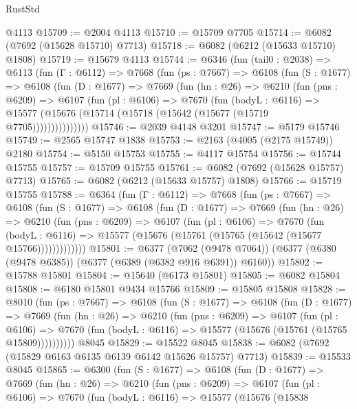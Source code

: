 \begin{lexlean}{RustStd}
\begin{coremodule}
    @4113
@15709 := @2004 @4113
@15710 := @15709 @7705
@15714 := @6082 (@7692 (@15628 @15710) @7713)
@15718 := @6082 (@6212 (@15633 @15710) @1808)
@15719 := @15679 @4113
@15744 := @6346
    (fun (tail0 : @2038) =>
    @6113
      (fun (Γ : @6112) =>
      @7668
        (fun (ps : @7667) =>
        @6108
          (fun (S : @1677) =>
          @6108
            (fun (D : @1677) =>
            @7669
              (fun (hn : @26) =>
              @6210
                (fun (pns : @6209) =>
                @6107
                  (fun (pl : @6106) =>
                  @7670
                    (fun (bodyL : @6116) =>
                    @15577 (@15676 (@15714 (@15718 (@15642 (@15677 (@15719 @7705)))))))))))))))
@15746 := @2039 @4148 @3201
@15747 := @5179 @15746
@15749 := @2565 @15747 @1838
@15753 := @2163 (@4005 (@2175 @15749)) @2180
@15754 := @5150 @15753
@15755 := @4117 @15754
@15756 := @15744 @15755
@15757 := @15709 @15755
@15761 := @6082 (@7692 (@15628 @15757) @7713)
@15765 := @6082 (@6212 (@15633 @15757) @1808)
@15766 := @15719 @15755
@15788 := @6364
    (fun (Γ : @6112) =>
    @7668
      (fun (ps : @7667) =>
      @6108
        (fun (S : @1677) =>
        @6108
          (fun (D : @1677) =>
          @7669
            (fun (hn : @26) =>
            @6210
              (fun (pns : @6209) =>
              @6107
                (fun (pl : @6106) =>
                @7670
                  (fun (bodyL : @6116) =>
                  @15577 (@15676 (@15761 (@15765 (@15642 (@15677 @15766)))))))))))))
@15801 := @6377
    (@7062 (@9478 @7064))
    (@6377 (@6380 (@9478 @6385)) (@6377 (@6389 (@6382 @916 @6391)) @6160))
@15802 := @15788 @15801
@15804 := @15640 (@6173 @15801)
@15805 := @6082 @15804
@15808 := @6180 @15801 @9434 @15766
@15809 := @15805 @15808
@15828 := @8010
    (fun (ps : @7667) =>
    @6108
      (fun (S : @1677) =>
      @6108
        (fun (D : @1677) =>
        @7669
          (fun (hn : @26) =>
          @6210
            (fun (pns : @6209) =>
            @6107
              (fun (pl : @6106) =>
              @7670 (fun (bodyL : @6116) => @15577 (@15676 (@15761 (@15765 @15809))))))))))
    @8045
@15829 := @15522 @8045
@15838 := @6082 (@7692 (@15829 @6163 @6135 @6139 @6142 @15626 @15757) @7713)
@15839 := @15533 @8045
@15865 := @6300
    (fun (S : @1677) =>
    @6108
      (fun (D : @1677) =>
      @7669
        (fun (hn : @26) =>
        @6210
          (fun (pns : @6209) =>
          @6107
            (fun (pl : @6106) =>
            @7670
              (fun (bodyL : @6116) =>
              @15577
                (@15676
                  (@15838

\end{coremodule}
\end{lexlean}

